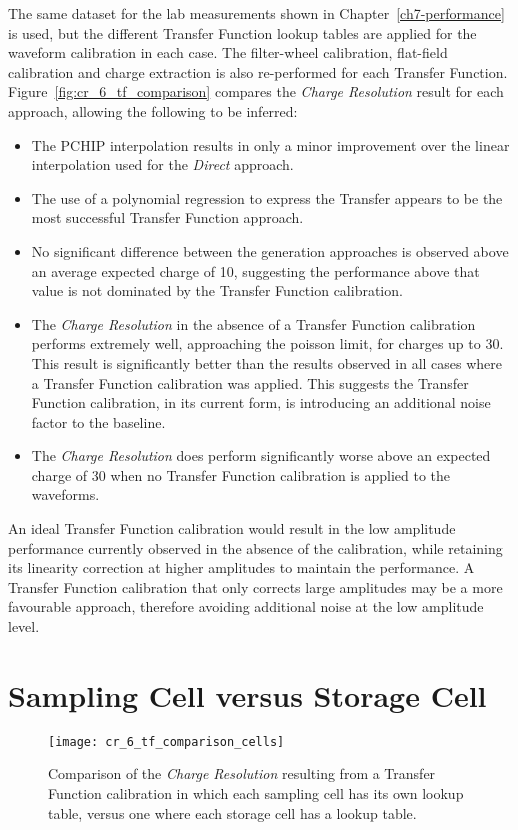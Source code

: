 The same dataset for the lab measurements shown in Chapter~\ref{ch7-performance} is used, but the different Transfer Function lookup tables are applied for the waveform calibration in each case. The filter-wheel calibration, flat-field calibration and charge extraction is also re-performed for each Transfer Function. Figure~\ref{fig:cr_6_tf_comparison} compares the \textit{Charge Resolution} result for each approach, allowing the following to be inferred:
\begin{itemize}
	\item The PCHIP interpolation results in only a minor improvement over the linear interpolation used for the \textit{Direct} approach.
	\item The use of a polynomial regression to express the Transfer appears to be the most successful Transfer Function approach.
	\item No significant difference between the generation approaches is observed above an average expected charge of \SI{10}{\pe}, suggesting the performance above that value is not dominated by the Transfer Function calibration.
	\item The \textit{Charge Resolution} in the absence of a Transfer Function calibration performs extremely well, approaching the poisson limit, for charges up to \SI{30}{\pe}. This result is significantly better than the results observed in all cases where a Transfer Function calibration was applied. This suggests the Transfer Function calibration, in its current form, is introducing an additional noise factor to the baseline.
	\item The \textit{Charge Resolution} does perform significantly worse above an expected charge of \SI{30}{\pe} when no Transfer Function calibration is applied to the waveforms.
\end{itemize}
An ideal Transfer Function calibration would result in the low amplitude performance currently observed in the absence of the calibration, while retaining its linearity correction at higher amplitudes to maintain the performance. A Transfer Function calibration that only corrects large amplitudes may be a more favourable approach, therefore avoiding additional noise at the low amplitude level.

\section{Sampling Cell versus Storage Cell}

\begin{figure}
	\centering
	\texttt{[image: cr\_6\_tf\_comparison\_cells]} 
	\caption[Comparison of the \textit{Charge Resolution} from the ``per sampling cell'' versus ``per storage cell''.]{Comparison of the \textit{Charge Resolution} resulting from a Transfer Function calibration in which each sampling cell has its own lookup table, versus one where each storage cell has a lookup table.} 
	\label{fig:cr_6_tf_comparison_cells}
\end{figure}

